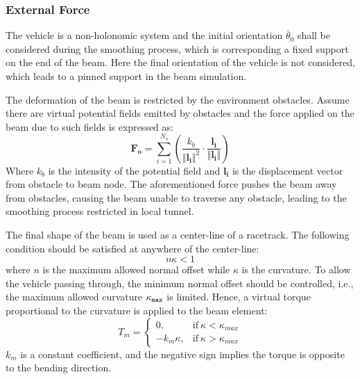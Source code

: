 \documentclass[conference, onecolumn]{IEEEtran}
\begin{document}
\subsubsection{External Force}

The vehicle is a non-holonomic system and the initial orientation $\bar{\theta}_0$ shall be considered during the smoothing process, which is corresponding a fixed support on the end of the beam. Here the final orientation of the vehicle is not considered, which leads to a pinned support in the beam simulation.

The deformation of the beam is restricted by the environment obstacles. Assume there are virtual potential fields emitted by obstacles and the force applied on the beam due to such fields is expressed as:
\begin{equation}	
    \boldsymbol{F_o}  = \sum_{i = 1}^{N_{o}} \left( \frac{k_{b}}{\Vert  \boldsymbol{l_i}\Vert ^2 } \cdot\frac{\boldsymbol{l_i}}{ \Vert \boldsymbol{l_i} \Vert  }\right)
	\label{obstaclesforce}
\end{equation}
Where $k_{b}$ is the intensity of the potential field and $\boldsymbol{l_i}$ is the displacement vector from obstacle to beam node.
The aforementioned force pushes the beam away from obstacles, causing the beam unable to traverse any obstacle, leading to the smoothing process restricted in local tunnel. 

The final shape of the beam is used as a center-line of a racetrack. The following condition should be satisfied at anywhere of the center-line:
\begin{equation}	
    n \kappa<1
	\label{trackoffsetcondition}
\end{equation}
where $n$ is the maximum allowed normal offset while $\kappa$ is the curvature. To allow the vehicle passing through, the minimum normal offset should be controlled, i.e., the maximum allowed curvature $\kappa_{\tt max}$ is limited. Hence, a virtual torque proportional to the curvature is applied to the beam element:
\begin{equation}	
	T_m=
    \begin{cases}
      0, & \text{if}\ \kappa<\kappa_{max} \\
      -k_m\kappa, & \text{if}\ \kappa>\kappa_{max} 
    \end{cases}
\end{equation}
$k_m$ is a constant coefficient, and the negative sign implies the torque is opposite to the bending direction.
\end{document}
